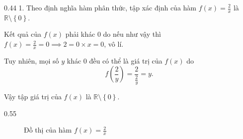 {
   \begin{minipageindent}{0.44\textwidth}
      1. Theo định nghĩa hàm phân thức, tập xác định của hàm $f(x) = \frac{2}{x}$ là $\mathbb{R} \setminus \left\{0\right\}$.
      
      Kết quả của $f(x)$ phải khác $0$ do nếu như vậy thì $f(x) = \frac{2}{x} = 0 \implies 2 = 0\times x = 0$, vô lí.
      
      Tuy nhiên, mọi số $y$ khác $0$ đều có thể là giá trị của $f(x)$ do $$f\left(\frac{2}{y}\right) = \frac{2}{\frac{2}{y}} = y.$$
      
      Vậy tập giá trị của $f(x)$ là $\mathbb{R} \setminus \left\{0\right\}$.
   \end{minipageindent}
   \hfill
   \begin{minipageindent}{0.55\textwidth}
      \begin{figure}[H]
         \centering
         \caption{Đồ thị của hàm $f(x) = \frac{2}{x}$}
         \label{fig:ham_so_mot_bien:phan_thuc:2_x}
      \end{figure}
   \end{minipageindent}
}

